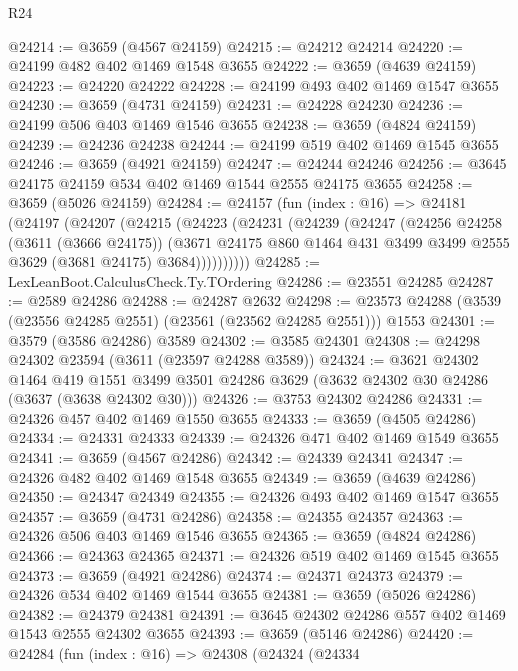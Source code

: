 \begin{lexlean}{R24}
\begin{coremodule}
@24214 := @3659 (@4567 @24159)
@24215 := @24212 @24214
@24220 := @24199 @482 @402 @1469 @1548 @3655
@24222 := @3659 (@4639 @24159)
@24223 := @24220 @24222
@24228 := @24199 @493 @402 @1469 @1547 @3655
@24230 := @3659 (@4731 @24159)
@24231 := @24228 @24230
@24236 := @24199 @506 @403 @1469 @1546 @3655
@24238 := @3659 (@4824 @24159)
@24239 := @24236 @24238
@24244 := @24199 @519 @402 @1469 @1545 @3655
@24246 := @3659 (@4921 @24159)
@24247 := @24244 @24246
@24256 := @3645 @24175 @24159 @534 @402 @1469 @1544 @2555 @24175 @3655
@24258 := @3659 (@5026 @24159)
@24284 := @24157
    (fun (index : @16) =>
    @24181
      (@24197
        (@24207
          (@24215
            (@24223
              (@24231
                (@24239
                  (@24247
                    (@24256
                      @24258
                      (@3611 (@3666 @24175))
                      (@3671
                        @24175
                        @860
                        @1464
                        @431
                        @3499
                        @3499
                        @2555
                        @3629
                        (@3681 @24175)
                        @3684))))))))))
@24285 := LexLeanBoot.CalculusCheck.Ty.TOrdering
@24286 := @23551 @24285
@24287 := @2589 @24286
@24288 := @24287 @2632
@24298 := @23573 @24288 (@3539 (@23556 @24285 @2551) (@23561 (@23562 @24285 @2551))) @1553
@24301 := @3579 (@3586 @24286) @3589
@24302 := @3585 @24301
@24308 := @24298 @24302 @23594 (@3611 (@23597 @24288 @3589))
@24324 := @3621
    @24302
    @1464
    @419
    @1551
    @3499
    @3501
    @24286
    @3629
    (@3632 @24302 @30 @24286 (@3637 (@3638 @24302 @30)))
@24326 := @3753 @24302 @24286
@24331 := @24326 @457 @402 @1469 @1550 @3655
@24333 := @3659 (@4505 @24286)
@24334 := @24331 @24333
@24339 := @24326 @471 @402 @1469 @1549 @3655
@24341 := @3659 (@4567 @24286)
@24342 := @24339 @24341
@24347 := @24326 @482 @402 @1469 @1548 @3655
@24349 := @3659 (@4639 @24286)
@24350 := @24347 @24349
@24355 := @24326 @493 @402 @1469 @1547 @3655
@24357 := @3659 (@4731 @24286)
@24358 := @24355 @24357
@24363 := @24326 @506 @403 @1469 @1546 @3655
@24365 := @3659 (@4824 @24286)
@24366 := @24363 @24365
@24371 := @24326 @519 @402 @1469 @1545 @3655
@24373 := @3659 (@4921 @24286)
@24374 := @24371 @24373
@24379 := @24326 @534 @402 @1469 @1544 @3655
@24381 := @3659 (@5026 @24286)
@24382 := @24379 @24381
@24391 := @3645 @24302 @24286 @557 @402 @1469 @1543 @2555 @24302 @3655
@24393 := @3659 (@5146 @24286)
@24420 := @24284
    (fun (index : @16) =>
    @24308
      (@24324
        (@24334

\end{coremodule}
\end{lexlean}

